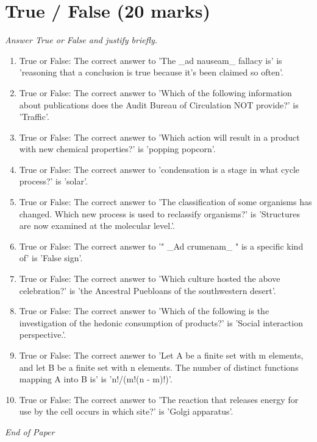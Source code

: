 \documentclass[12pt]{article}
\begin{document}
\section*{True / False (20 marks)}
\textit{Answer True or False and justify briefly.}
\begin{enumerate}[label=\arabic*.]
\item True or False: The correct answer to 'The \_ad nauseam\_ fallacy is' is 'reasoning that a conclusion is true because it's been claimed so often'.
\item True or False: The correct answer to 'Which of the following information about publications does the Audit Bureau of Circulation NOT provide?' is 'Traffic'.
\item True or False: The correct answer to 'Which action will result in a product with new chemical properties?' is 'popping popcorn'.
\item True or False: The correct answer to 'condensation is a stage in what cycle process?' is 'solar'.
\item True or False: The correct answer to 'The classification of some organisms has changed. Which new process is used to reclassify organisms?' is 'Structures are now examined at the molecular level.'.
\item True or False: The correct answer to '" \_Ad crumenam\_ " is a specific kind of' is 'False sign'.
\item True or False: The correct answer to 'Which culture hosted the above celebration?' is 'the Ancestral Puebloans of the southwestern desert'.
\item True or False: The correct answer to 'Which of the following is the investigation of the hedonic consumption of products?' is 'Social interaction perspective.'.
\item True or False: The correct answer to 'Let A be a finite set with m elements, and let B be a finite set with n elements. The number of distinct functions mapping A into B is' is 'n!/(m!(n - m)!)'.
\item True or False: The correct answer to 'The reaction that releases energy for use by the cell occurs in which site?' is 'Golgi apparatus'.
\end{enumerate}

\vfill
\noindent\textit{End of Paper}
\end{document}
